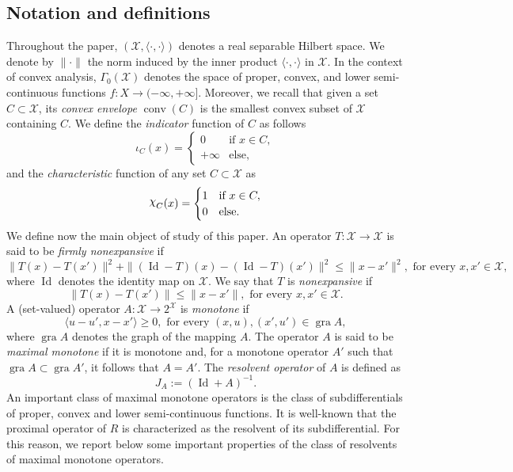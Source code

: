 \documentclass[onefignum,onetabnum]{siamonline250211}
\newcommand{\Id}{\operatorname{Id}}
\newcommand{\gra}{\operatorname{gra}}
\newcommand{\conv}{\operatorname{conv}}
\newcommand{\cX}{\mathcal{X}}
\DeclareRobustCommand{\Chi}{{\mathpalette\irchi\relax}}
\newcommand{\irchi}[2]{\raisebox{\depth}{$#1\chi$}} %
\begin{document}
\subsection{Notation and definitions} \label{sec:defs}
Throughout the paper, $(\cX, \langle\cdot,\cdot\rangle)$ denotes a real separable Hilbert space. We denote by $\|\cdot\|$ the norm induced by the inner product $\langle\cdot,\cdot\rangle$ in $\cX$. In the context of convex analysis, $\Gamma_0(\cX)$ denotes the space of proper, convex, and lower semi-continuous functions $f: X\to(-\infty, +\infty]$. Moreover, we recall that given a set $C\subset \cX$, its \emph{convex envelope} $\conv (C)$ is the smallest convex subset of $\cX$ containing $C$. We define the \emph{indicator} function of $C$ as follows
$$
\iota_C(x)=
\begin{cases}
0 & \text{if } x\in C,\\
+\infty & \text{else},
\end{cases}
$$
and the \emph{characteristic} function of any set $C\subset \cX$ as
$$
\Chi_C(x)=
\begin{cases}
1 & \text{if } x\in C,\\
0 & \text{else}.
\end{cases}
$$
We define now the main object of study of this paper. An operator $T:\cX\to\cX$ is said to be \emph{firmly nonexpansive} if
\[\|T(x)-T(x')\|^2+\|(\Id-T)(x)-(\Id-T)(x')\|^2\leq\|x-x'\|^2, \text{ for every } x,x'\in\cX,\]
where $\Id$ denotes the identity map on $\cX$. We say that $T$ is
\emph{nonexpansive} if
\[\|T(x)-T(x')\|\leq\|x-x'\|, \text{ for every } x,x'\in\cX.\]
A (set-valued) operator $A:\cX\to 2^\cX$ is \emph{monotone} if
\[\langle u-u',x-x'\rangle \geq 0, \text{ for every } (x,u),(x',u') \in \gra A,\]
where $\gra A$ denotes the graph of the mapping $A$. The operator $A$ is said to be \emph{maximal monotone} if it is monotone and, for a monotone operator $A'$ such that $\gra A \subset \gra A'$, it follows that $A=A'$. The \emph{resolvent operator} of $A$ is defined as 
$$
J_A:=(\Id+A)^{-1}.
$$
An important class of maximal monotone operators is the class of subdifferentials of proper, convex and lower semi-continuous functions. It is well-known \cite{BCombettes} that the proximal operator of $R$ is characterized as the resolvent of its subdifferential. For this reason, we report below some important properties of the class of resolvents of maximal monotone operators.
\end{document}

